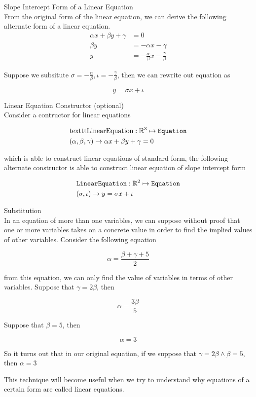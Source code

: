 \documentclass{book}
\begin{document}
  {\remark Slope Intercept Form of a Linear Equation \\
    From the original form of the linear equation, we can derive the following alternate form of a linear equation.
    \begin{align*}
      \alpha x + \beta y + \gamma & = 0\\
      \beta y & = - \alpha x - \gamma\\
      y & = -\frac{\alpha}{\beta} x - \frac{\gamma}{\beta}
    \end{align*}

    Suppose we subsitute $\sigma = - \frac{\alpha}{\beta}, \iota = - \frac{\gamma}{\beta}$, then we can rewrite out equation as

    $$y = \sigma x + \iota$$
  }

  {\remark Linear Equation Constructor (optional) \\
    Consider a contructor for linear equations

    \begin{align*}
      & \text{texttt{LinearEquation}}: \mathbb{R}^3 \mapsto \text{\texttt{Equation}}\\
      & (\alpha, \beta, \gamma) \to \alpha x + \beta y + \gamma = 0
    \end{align*}

    which is able to construct linear equations of standard form, the following alternate constructor is able to construct linear equation of slope intercept form

    \begin{align*}
      & \text{\texttt{LinearEquation}}: \mathbb{R}^2 \mapsto \text{\texttt{Equation}}\\
      & (\sigma, \iota) \to y = \sigma x + \iota
    \end{align*}
  }

  {\remark Substitution \\

    In an equation of more than one variables, we can suppose without proof that one or more variables takes on a concrete value in order to find the implied values of other variables. Consider the following equation

    $$\alpha = \frac{\beta + \gamma + 5}{2}$$

    from this equation, we can only find the value of variables in terms of other variables. Suppose that $\gamma = 2\beta$, then

    $$\alpha = \frac{3\beta}{5}$$

    Suppose that $\beta = 5$, then

    $$\alpha = 3$$

    So it turns out that in our original equation, if we suppose that $\gamma = 2\beta \land \beta = 5$, then $\alpha = 3$

    This technique will become useful when we try to understand why equations of a certain form are called linear equations.\\
  }
\end{document}
